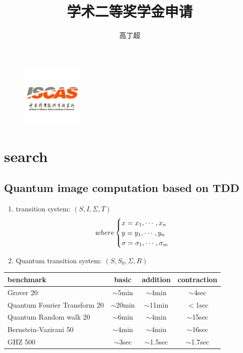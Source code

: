 \documentclass[aspectratio=1610,18pt]{ctexbeamer}
\title{学术二等奖学金申请}
\author{高丁超}
\begin{document}
\begin{frame}[plain]
  \titlepage
  \begin{figure}
    \centering
    \includegraphics[width=3cm]{iscas.png}
  \end{figure}
\end{frame}
\section{search}
\subsection{Quantum image computation based on TDD}
\begin{frame}
  \begin{enumerate}
    \Large
    \item  transition system: $(S, I, \Sigma, T)$
    \begin{equation}
      where
      \begin{cases}
        x = x_1, \cdots, x_n\\
        y = y_1, \cdots, y_n\\
        \sigma = \sigma_1, \cdots, \sigma_m
      \end{cases}
      \notag
    \end{equation}
    \item Quantum transition system: $(S, S_0, \Sigma, R)$
  \end{enumerate}
\end{frame}

\begin{frame}
  \begin{table}[]
    \Large
    \rule{0pt}{30pt}
    \begin{tabular}{l|ccc}
    benchmark & basic & addition& contraction \\\hline
    Grover 20       & $\sim$5min  & $\sim$4min & $\sim$4sec  \\
    Quantum Fourier Transform 20           & $\sim$20min & $\sim$11min & $<$1sec \\
    Quantum Random walk 20           & $\sim$6min & $\sim$4min & $\sim$15sec\\
    Bernstein-Vazirani 50           & $\sim$4min & $\sim$4min & $\sim$16sec \\
    GHZ 500         & $\sim$3sec & $\sim$1.5sec & $\sim$1.7sec\\
    \end{tabular}
    \end{table}
\end{frame}
\end{document}

